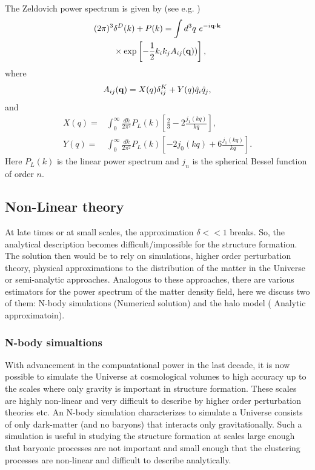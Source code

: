 The Zeldovich power spectrum is given by (see e.g. \cite{})
\begin{align}
(2\pi)^3&\delta^D (k)+P(k)=\int d^3 q ~e^{-i\mathbf{q}\cdot\mathbf{k}}\nonumber\\
&\times\exp\left[-\frac{1}{2}k_ik_jA_{ij}(\mathbf{q}))\right],
\label{eq:PSwithAW}
\end{align}
where 
\begin{equation}
A_{ij}(\mathbf{q})=X(q)\delta^K_{ij}+Y(q)\hat{q}_i\hat{q}_j,
\end{equation}
and
\begin{align}
  X(q) =& \int_0^\infty \frac{dk}{2\pi^2} P_L(k)
  \left[\frac{2}{3} - 2 \frac{j_1(kq)}{kq}\right] , \\
  Y(q) =& \int_0^\infty \frac{dk}{2\pi^2} P_L(k)
  \left[-2 j_0(kq) + 6 \frac{j_1(kq)}{kq}\right] .
  \label{eq:XYex}
\end{align}
Here $P_L(k)$ is the linear power spectrum and $j_n$ is the spherical Bessel function of order $n$. 

\subsection{Non-Linear theory}

At late times or at small scales, the approximation $\delta << 1$ breaks. So, the analytical
description becomes difficult/impossible for the structure formation. The solution then would 
be to rely on simulations, higher order perturbation theory, physical approximations to the
distribution of the matter in the Universe or semi-analytic approaches. Analogous to these
approaches, there are various estimators for the power spectrum of the matter density field,
here we discuss two of them: N-body simulations (Numerical solution) and the halo model (
Analytic approximatoin).

\subsubsection{N-body simualtions}

With advancement in the compuatational power in the last decade, it is now possible to
simulate the Universe at cosmological volumes to high accuracy up to the scales where
only gravity is important in structure formation. These scales are highly non-linear and
very difficult to describe by higher order perturbation theories etc. An N-body simulation
characterizes to simulate a Universe consists of only dark-matter (and no baryons) that 
interacts only gravitationally. Such a simulation is useful in studying the
structure formation at scales large enough that baryonic processes are not 
important and small enough that the clustering processes are non-linear and difficult
to describe analytically. 


